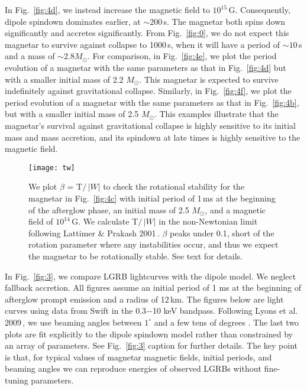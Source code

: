 \documentclass{article}
\begin{document}
In Fig.~\ref{fig:4d}, we instead increase the magnetic field to $10^{15}$\,G. Consequently, dipole spindown dominates earlier, at $\sim 200$\,s. The magnetar both spins down significantly and accretes significantly. From Fig.~\ref{fig:0}, we do not expect this magnetar to survive against collapse to 1000\,s, when it will have a period of $\sim 10$\,s and a mass of $\sim 2.8 M_{\odot}$. For comparison, in Fig.~\ref{fig:4e}, we plot the period evolution of a magnetar with the same parameters as that in Fig.~\ref{fig:4d} but with a smaller initial mass of 2.2 $M_{\odot}$. This magnetar is expected to survive indefinitely against gravitational collapse. Similarly, in Fig.~\ref{fig:4f}, we plot the period evolution of a magnetar with the same parameters as that in Fig.~\ref{fig:4b}, but with a smaller initial mass of 2.5 $M_{\odot}$. This examples illustrate that the magnetar's survival against gravitational collapse is highly sensitive to its initial mass and mass accretion, and its spindown at late times is highly sensitive to the magnetic field.

\begin{figure}[h!]
\centering
\texttt{[image: tw]}
\caption{We plot $\beta$ = T$/$\,$|W|$ to check the rotational stability for the magnetar in Fig.~\ref{fig:4c} with initial period of 1\,ms at the beginning of the afterglow phase, an initial mass of 2.5 $M_{\odot}$, and a magnetic field of $10^{14}$\,G. We calculate T$/$\,$|W|$ in the non-Newtonian limit following Lattimer \& Prakash 2001\,\cite{Lattimer:2001ap}. $\beta$ peaks under 0.1, short of the rotation parameter where any instabilities occur, and thus we expect the magnetar to be rotationally stable. See text for details.}
\label{fig:tw}
\end{figure}

In Fig.~\ref{fig:3}, we compare LGRB lightcurves with the dipole model. We neglect fallback accretion. All figures assume an initial period of 1 ms at the beginning of afterglow prompt emission and a radius of 12\,km. The figures below are light curves using data from Swift in the 0.3$-$10 keV bandpass. Following Lyons et al.\,2009\,\cite{Lyons:2009ka}, we use beaming angles between $1^{\circ}$ and a few tens of degrees \cite{Lyons:2009ka}.  The last two plots are fit explicitly to the dipole spindown model rather than constrained by an array of parameters. See Fig.~\ref{fig:3} caption for further details. The key point is that, for typical values of magnetar magnetic fields, initial periods, and beaming angles we can reproduce energies of observed LGRBs without fine-tuning parameters.
\end{document}
